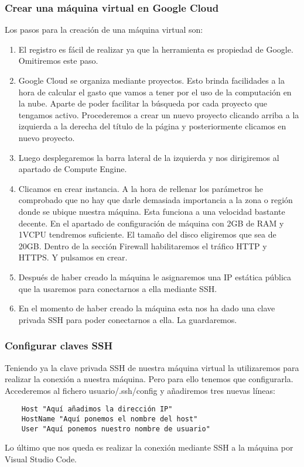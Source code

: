 \subsubsection{Crear una máquina virtual en Google Cloud}
Los pasos para la creación de una máquina virtual son:

\begin{enumerate}
    \item El registro es fácil de realizar ya que la herramienta es propiedad de Google. Omitiremos este paso.
    \item Google Cloud se organiza mediante proyectos. Esto brinda facilidades a la hora de calcular el gasto que vamos a tener por el uso de la computación en la nube. Aparte de poder facilitar la búsqueda por cada proyecto que tengamos activo. Procederemos a crear un nuevo proyecto clicando arriba a la izquierda a la derecha del título de la página y posteriormente clicamos en nuevo proyecto.
    \item Luego desplegaremos la barra lateral de la izquierda y nos dirigiremos al apartado de Compute Engine.
    \item Clicamos en crear instancia. A la hora de rellenar los parámetros he comprobado que no hay que darle demasiada importancia a la zona o región donde se ubique nuestra máquina. Esta funciona a una velocidad bastante decente. En el apartado de configuración de máquina con 2GB de RAM y 1VCPU tendremos suficiente. El tamaño del disco eligiremos que sea de 20GB. Dentro de la sección Firewall habilitaremos el tráfico HTTP y HTTPS. Y pulsamos en crear.
    \item Después de haber creado la máquina le asignaremos una IP estática pública que la usaremos para conectarnos a ella mediante SSH.
    \item En el momento de haber creado la máquina esta nos ha dado una clave privada SSH para poder conectarnos a ella. La guardaremos.
\end{enumerate}

\subsubsection{Configurar claves SSH}

Teniendo ya la clave privada SSH de nuestra máquina virtual la utilizaremos para realizar la conexión a nuestra máquina. Pero para ello tenemos que configurarla. Accederemos al fichero usuario/.ssh/config y añadiremos tres nuevas líneas:
\begin{verbatim}
    Host "Aquí añadimos la dirección IP"
    HostName "Aquí ponemos el nombre del host"
    User "Aquí ponemos nuestro nombre de usuario"
\end{verbatim}
Lo último que nos queda es realizar la conexión mediante SSH a la máquina por Visual Studio Code.

